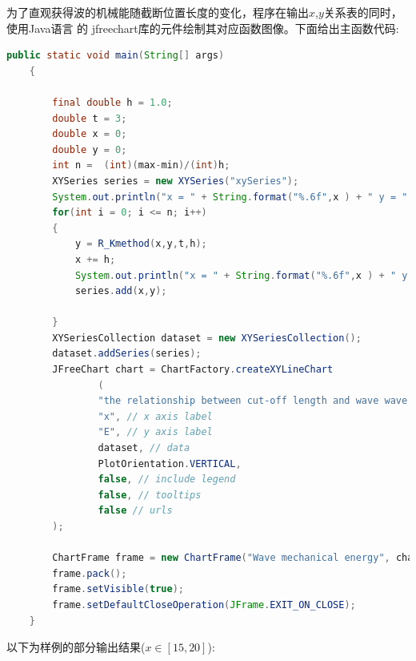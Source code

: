 \documentclass[lang=cn,a4paper,newtx]{elegantpaper}
\begin{document}
为了直观获得波的机械能随截断位置长度的变化，程序在输出$x$,$y$关系表的同时，使用Java语言
的
jfreechart库的元件绘制其对应函数图像。下面给出主函数代码:
\begin{lstlisting}[language=java]
  public static void main(String[] args)
    {

        final double h = 1.0;
        double t = 3;
        double x = 0;
        double y = 0;
        int n =  (int)(max-min)/(int)h;
        XYSeries series = new XYSeries("xySeries");
        System.out.println("x = " + String.format("%.6f",x ) + " y = " + String.format("%.6f",y ));
        for(int i = 0; i <= n; i++)
        {
            y = R_Kmethod(x,y,t,h);
            x += h;
            System.out.println("x = " + String.format("%.6f",x ) + " y = " + String.format("%.6f",y ));
            series.add(x,y);

        }
        XYSeriesCollection dataset = new XYSeriesCollection();
        dataset.addSeries(series);
        JFreeChart chart = ChartFactory.createXYLineChart
                (
                "the relationship between cut-off length and wave wave mechanical energy", // chart title
                "x", // x axis label
                "E", // y axis label
                dataset, // data
                PlotOrientation.VERTICAL,
                false, // include legend
                false, // tooltips
                false // urls
        );

        ChartFrame frame = new ChartFrame("Wave mechanical energy", chart);
        frame.pack();
        frame.setVisible(true);
        frame.setDefaultCloseOperation(JFrame.EXIT_ON_CLOSE);
    }
\end{lstlisting}
以下为样例的部分输出结果($x\in[15,20]$):
\end{document}
